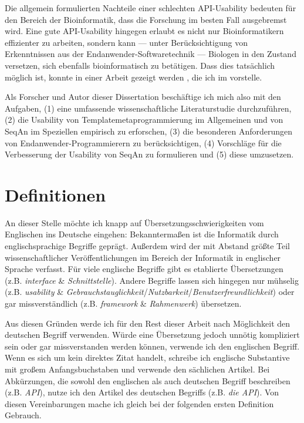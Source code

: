Die allgemein formulierten Nachteile einer schlechten API-Usability bedeuten für den Bereich der Bioinformatik, dass die Forschung im besten Fall ausgebremst wird. Eine gute API-Usability hingegen erlaubt es nicht nur Bioinformatikern effizienter zu arbeiten, sondern kann --- unter Berücksichtigung von Erkenntnissen aus der Endanwender-Softwaretechnik --- Biologen in den Zustand versetzen, sich ebenfalls bioinformatisch zu betätigen. Dass dies tatsächlich möglich ist, konnte in einer Arbeit gezeigt werden \citep{Letondal:2006dy}, die ich im  vorstelle.

\bigskip

Als Forscher und Autor dieser Dissertation beschäftige ich mich also mit den Aufgaben, (1) eine umfassende wissenschaftliche Literaturstudie durchzuführen, (2) die Usability von Templatemetaprogrammierung im Allgemeinen und von SeqAn im Speziellen empirisch zu erforschen, (3) die besonderen Anforderungen von Endanwender-Programmierern zu berücksichtigen, (4) Vorschläge für die Verbesserung der Usability von SeqAn zu formulieren und (5) diese umzusetzen.





\section{Definitionen}
\label{sec:definitions}

An dieser Stelle möchte ich knapp auf Übersetzungsschwierigkeiten vom Englischen ins Deutsche eingehen: Bekanntermaßen ist die Informatik durch englischsprachige Begriffe geprägt. Außerdem wird der mit Abstand größte Teil wissenschaftlicher Veröffentlichungen im Bereich der Informatik in englischer Sprache verfasst. Für viele englische Begriffe gibt es etablierte Übersetzungen (z.B. \textit{interface} \& \textit{Schnittstelle}). Andere Begriffe lassen sich hingegen nur mühselig (z.B. \textit{usability} \& \textit{Gebrauchstauglichkeit}/\textit{Nutzbarkeit}/\textit{Benutzerfreundlichkeit}) oder gar missverständlich (z.B. \textit{framework} \& \textit{Rahmenwerk}) übersetzen.

Aus diesen Gründen werde ich für den Rest dieser Arbeit nach Möglichkeit den deutschen Begriff verwenden. Würde eine Übersetzung jedoch unnötig kompliziert sein oder gar missverstanden werden können, verwende ich den englischen Begriff. Wenn es sich um kein direktes Zitat handelt, schreibe ich englische Substantive mit großem Anfangsbuchstaben und verwende den sächlichen Artikel. Bei Abkürzungen, die sowohl den englischen als auch deutschen Begriff beschreiben (z.B. \textit{API}), nutze ich den Artikel des deutschen Begriffs (z.B. \textit{die API}). Von diesen Vereinbarungen mache ich gleich bei der folgenden ersten Definition Gebrauch.

